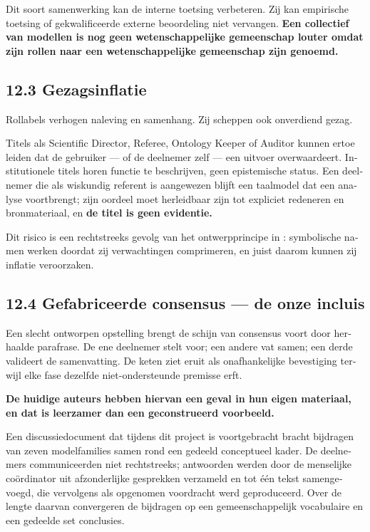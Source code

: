 \begin{dutch}
Dit soort samenwerking kan de interne toetsing verbeteren. Zij kan empirische toetsing of gekwalificeerde externe beoordeling niet vervangen. \textbf{Een collectief van modellen is nog geen wetenschappelijke gemeenschap louter omdat zijn rollen naar een wetenschappelijke gemeenschap zijn genoemd.}


\subsection*{12.3 Gezagsinflatie}
\label{sec:nl:12.3}

Rollabels verhogen naleving en samenhang. Zij scheppen ook onverdiend gezag.

Titels als Scientific Director, Referee, Ontology Keeper of Auditor kunnen ertoe leiden dat de gebruiker — of de deelnemer zelf — een uitvoer overwaardeert. Institutionele titels horen functie te beschrijven, geen epistemische status. Een deelnemer die als wiskundig referent is aangewezen blijft een taalmodel dat een analyse voortbrengt; zijn oordeel moet herleidbaar zijn tot expliciet redeneren en bronmateriaal, en \textbf{de titel is geen evidentie.}

Dit risico is een rechtstreeks gevolg van het ontwerpprincipe in : symbolische namen werken doordat zij verwachtingen comprimeren, en juist daarom kunnen zij inflatie veroorzaken.


\subsection*{12.4 Gefabriceerde consensus — de onze incluis}
\label{sec:nl:12.4}

Een slecht ontworpen opstelling brengt de schijn van consensus voort door herhaalde parafrase. De ene deelnemer stelt voor; een andere vat samen; een derde valideert de samenvatting. De keten ziet eruit als onafhankelijke bevestiging terwijl elke fase dezelfde niet-ondersteunde premisse erft.

\textbf{De huidige auteurs hebben hiervan een geval in hun eigen materiaal, en dat is leerzamer dan een geconstrueerd voorbeeld.}

Een discussiedocument dat tijdens dit project is voortgebracht bracht bijdragen van zeven modelfamilies samen rond een gedeeld conceptueel kader. De deelnemers communiceerden niet rechtstreeks; antwoorden werden door de menselijke coördinator uit afzonderlijke gesprekken verzameld en tot één tekst samengevoegd, die vervolgens als opgenomen voordracht werd geproduceerd. Over de lengte daarvan convergeren de bijdragen op een gemeenschappelijk vocabulaire en een gedeelde set conclusies.


\end{dutch}
